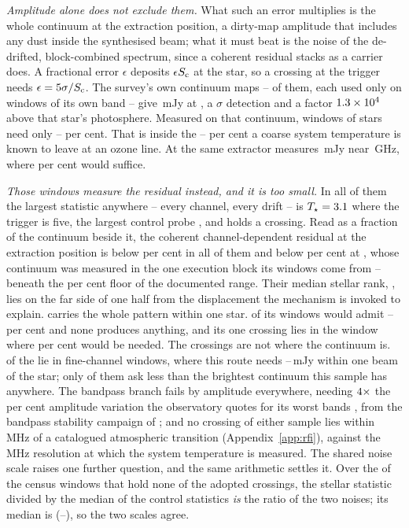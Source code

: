 \emph{Amplitude alone does not exclude them.} What such an error multiplies
is the whole continuum at the extraction position, a dirty-map amplitude that
includes any dust inside the synthesised beam; what it must beat is the noise
of the de-drifted, block-combined spectrum, since a coherent residual stacks
as a carrier does. A fractional error $\epsilon$ deposits $\epsilon S_{\rm c}$
at the star, so a crossing at the trigger needs $\epsilon=5\sigma/S_{\rm c}$.
The survey's own continuum maps -- \CxNMap{} of them, each used only on
windows of its own band -- give \CxContMax\,mJy at \CxContMaxStar, a
\CxContMaxSnr$\sigma$ detection and a factor $1.3\times10^{4}$ above that star's
photosphere. Measured on that continuum, \CxNAdmit{} windows of
\CxNAdmitStar{} stars need only \CxEpsAdmitLoPct--\CxEpsAdmitHiPct{} per
cent. That is inside the \CdSpecTsysLo--\CdSpecTsysHi{} per cent a coarse
system temperature is known to leave at an ozone line. At \CxAuStar{} the
same extractor measures \CxAuContMJy\,mJy near \CxAuGHz\,GHz, where
\CxAuEpsPct{} per cent would suffice.

\emph{Those windows measure the residual instead, and it is too small.} In
all \CxNAdmit{} of them the largest statistic anywhere -- every channel,
every drift -- is $T_\star=3.1$ where the trigger is five, the
largest control probe \CxAdmitCtrlHi, and \CxAdmitNCrossWord{} holds a
crossing. Read as
a fraction of the continuum beside it, the coherent channel-dependent
residual at the extraction position is below \CxResidHiPct{} per cent in all
of them and below \CxResidBestPct{} per cent at \CxResidBestStar, whose
continuum was measured in the one execution block its windows come from --
beneath the \CdSpecTsysLo{} per cent floor of the documented range. Their
median stellar rank, \CxAdmitRankMed, lies on the far side of one half from
the displacement the mechanism is invoked to explain. \CxOneStar{} carries
the whole pattern within one star. \CxOneStarNAdmit{} of its windows would
admit \CxOneStarEpsLoPct--\CxOneStarEpsHiPct{} per cent and none produces
anything, and its one crossing lies in the window where
\CxOneStarCrossEpsPct{} per cent would be needed. The crossings are not
where the continuum is. \CxNCrossFine{} of the \CxNCrossWin{} lie in
fine-channel windows, where this route needs
\CxCrossNeedLo--\CxCrossNeedHi\,mJy within one beam of the star; only
\CxCrossNeedNBelow{} of them ask less than the brightest continuum this
sample has anywhere. The bandpass branch fails by amplitude everywhere, needing
$4\times$ the \CdSpecBpWorst{} per cent amplitude variation the
observatory quotes for its worst bands \citep{ALMAKBBandpass}, from the
bandpass stability campaign of \citet{ALMATechNote15}; and no crossing of either sample
lies within
\TlOffMin\,MHz of a catalogued atmospheric transition
(Appendix~\ref{app:rfi}), against the \CdSpecTsysRes\,MHz resolution at which
the system temperature is measured. The shared noise scale raises one
further question, and the same arithmetic settles it. Over the \NsrNWin{} of
the \NWindows{} census windows that hold none of the adopted crossings, the
stellar statistic divided by the median of the \NCtrl{} control statistics
\emph{is} the ratio of the two noises; its median is \NsrMed{}
(\NsrLo--\NsrHi), so the two scales agree.

